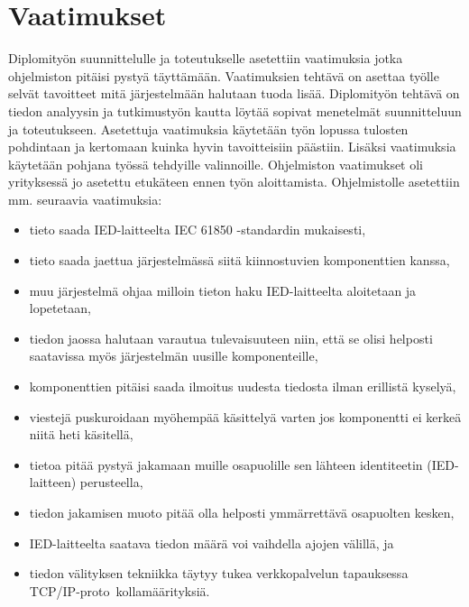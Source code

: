 \section{Vaatimukset}
\label{ch:vaatimukset}
Diplomityön suunnittelulle ja toteutukselle asetettiin vaatimuksia jotka ohjelmiston pitäisi pystyä täyttämään. Vaatimuksien tehtävä on asettaa työlle selvät tavoitteet mitä järjestelmään halutaan tuoda lisää. Diplomityön tehtävä on tiedon analyysin ja tutkimustyön kautta löytää sopivat menetelmät suunnitteluun ja toteutukseen. Asetettuja vaatimuksia käytetään työn lopussa tulosten pohdintaan ja kertomaan kuinka hyvin tavoitteisiin päästiin. Lisäksi vaatimuksia käytetään pohjana työssä tehdyille valinnoille. Ohjelmiston vaatimukset oli yrityksessä jo asetettu etukäteen ennen työn aloittamista. Ohjelmistolle asetettiin mm. seuraavia vaatimuksia:
\begin{itemize}
	\item tieto saada IED-laitteelta IEC 61850 -standardin mukaisesti,
	\item tieto saada jaettua järjestelmässä siitä kiinnostuvien komponenttien kanssa,
	\item muu järjestelmä ohjaa milloin tieton haku IED-laitteelta aloitetaan ja lopetetaan,
	\item tiedon jaossa halutaan varautua tulevaisuuteen niin, että se olisi helposti saatavissa myös järjestelmän uusille komponenteille,
	\item komponenttien pitäisi saada ilmoitus uudesta tiedosta ilman erillistä kyselyä,
	\item viestejä puskuroidaan myöhempää käsittelyä varten jos komponentti ei kerkeä niitä heti käsitellä,
	\item tietoa pitää pystyä jakamaan muille osapuolille sen lähteen identiteetin (IED-laitteen) perusteella,
	\item tiedon jakamisen muoto pitää olla helposti ymmärrettävä osapuolten kesken,
	\item IED-laitteelta saatava tiedon määrä voi vaihdella ajojen välillä, ja
	\item tiedon välityksen tekniikka täytyy tukea verkkopalvelun tapauksessa TCP/IP-pro\-to \-kol\-la\-mää\-ri\-tyk\-si\-ä.
\end{itemize}


